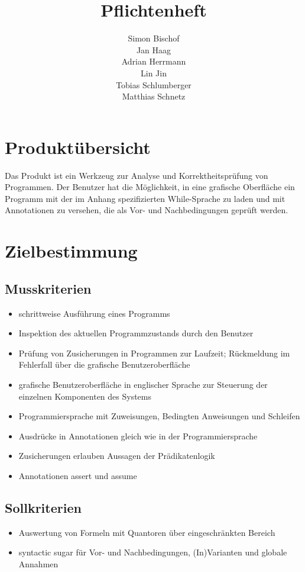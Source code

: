 \documentclass[a4paper,10pt]{article}
\title{Pflichtenheft}
\author{Simon Bischof\\
Jan Haag\\
Adrian Herrmann\\
Lin Jin\\
Tobias Schlumberger\\
Matthias Schnetz}
\begin{document}
\maketitle
\newpage
\tableofcontents
\newpage

\section{Produktübersicht}

Das Produkt ist ein Werkzeug zur Analyse und Korrektheitsprüfung von Programmen.
Der Benutzer hat die Möglichkeit, in eine grafische Oberfläche ein Programm mit
der im Anhang spezifizierten While-Sprache zu laden und mit Annotationen zu
versehen, die als Vor- und Nachbedingungen geprüft werden.

\section{Zielbestimmung}

\subsection{Musskriterien}
\begin{itemize}
  \item schrittweise Ausführung eines Programms
  \item Inspektion des aktuellen Programmzustands durch den Benutzer
  \item Prüfung von Zusicherungen in Programmen zur Laufzeit; Rückmeldung im
  Fehlerfall über die grafische Benutzeroberfläche
  \item grafische Benutzeroberfläche in englischer Sprache zur Steuerung der
  einzelnen Komponenten des Systems
  \item Programmiersprache mit Zuweisungen, Bedingten Anweisungen und Schleifen
  \item Ausdrücke in Annotationen gleich wie in der Programmiersprache
  \item Zusicherungen erlauben Aussagen der Prädikatenlogik
  \item Annotationen assert und assume
\end{itemize}

\subsection{Sollkriterien}
\begin{itemize}
  \item Auswertung von Formeln mit Quantoren über eingeschränkten Bereich
  \item syntactic sugar für Vor- und Nachbedingungen, (In)Varianten und globale
  Annahmen
\end{itemize}
\end{document}

